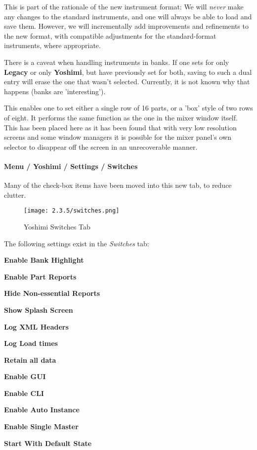    This is part of the rationale of the new instrument format: We will
   \textsl{never} make any changes to the standard instruments, and one will always
   be able to load and save them. However, we will incrementally add improvements
   and refinements to the new format, with compatible
   adjustments for the standard-format instruments, where appropriate.

   There is a caveat when handling instruments in banks. If one sets for
   only \textbf{Legacy} or only \textbf{Yoshimi}, but have previously set
   for both, saving to such a dual entry will erase the one that wasn't
   selected. Currently, it is not known why that happens (banks are
   'interesting').

   This enables one to set either a single row of 16 parts, or a 'box'
   style of two rows of eight. It performs the same function as the one
   in the mixer window itself. This has been placed here as it has been
   found that with very low resolution screens and some window managers
   it is possible for the mixer panel's own selector to disappear off the
   screen in an unrecoverable manner.

\paragraph{Menu / Yoshimi / Settings / Switches}
\label{paragraph:menu_yoshimi_settings_switches}

   Many of the check-box items have been moved into this new tab, to reduce
   clutter.

\begin{figure}[H]
   \centering
   \texttt{[image: 2.3.5/switches.png]}
   \caption{Yoshimi Switches Tab}
   \label{fig:yoshimi_settings_switches_tab}
\end{figure}

   The following settings exist in the \textsl{Switches} tab:

   \begin{enumber}
      \item \textbf{Enable Bank Highlight}
      \item \textbf{Enable Part Reports}
      \item \textbf{Hide Non-essential Reports}
      \item \textbf{Show Splash Screen}
      \item \textbf{Log XML Headers}
      \item \textbf{Log Load times}
      \item \textbf{Retain all data}
      \item \textbf{Enable GUI}
      \item \textbf{Enable CLI}
      \item \textbf{Enable Auto Instance}
      \item \textbf{Enable Single Master}
      \item \textbf{Start With Default State}
   \end{enumber}

